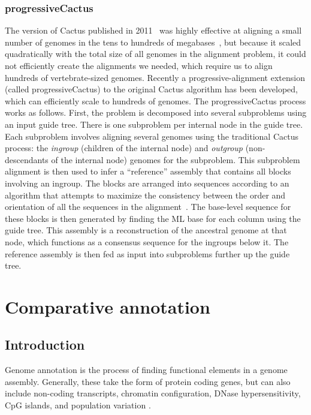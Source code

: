 \documentclass[fleqn,10pt]{wlscirep}
\begin{document}
\subsubsection{progressiveCactus}
The version of Cactus published in 2011~\cite{cactusGenomeRes} was highly effective at aligning a small number of genomes in the tens to hundreds of megabases~\cite{Earl2014}, but because it scaled quadratically with the total size of all genomes in the alignment problem, it could not efficiently create the alignments we needed, which require us to align hundreds of vertebrate-sized genomes.
Recently a progressive-alignment extension (called progressiveCactus) to the original Cactus algorithm has been developed, which can efficiently scale to hundreds of genomes.
The progressiveCactus process works as follows.
First, the problem is decomposed into several subproblems using an input guide tree.
There is one subproblem per internal node in the guide tree.
Each subproblem involves aligning several genomes using the traditional Cactus process: the \emph{ingroup} (children of the internal node) and \emph{outgroup} (non-descendants of the internal node) genomes for the subproblem.
This subproblem alignment is then used to infer a ``reference'' assembly that contains all blocks involving an ingroup.
The blocks are arranged into sequences according to an algorithm that attempts to maximize the consistency between the order and orientation of all the sequences in the alignment~\cite{referenceAlg}.
The base-level sequence for these blocks is then generated by finding the ML base for each column using the guide tree.
This assembly is a reconstruction of the ancestral genome at that node, which functions as a consensus sequence for the ingroups below it.
The reference assembly is then fed as input into subproblems further up the guide tree.

\section{Comparative annotation}

\subsection{Introduction}
Genome annotation is the process of finding functional elements in a genome assembly. Generally, these take the form of protein coding genes, but can also include non-coding transcripts\cite{harrow2012gencode},
chromatin configuration, DNase hypersensitivity\cite{encode2004encode}, CpG islands, and population variation \cite{sherry2001dbsnp}.
\end{document}
